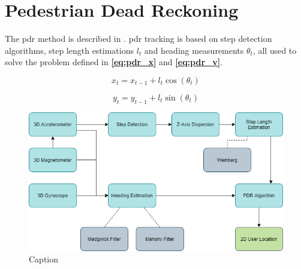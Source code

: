 \section{Pedestrian Dead Reckoning}

The \gls{pdr} method is described in \cite{HybridPositioningPaper}. \gls{pdr} tracking is based on step detection algorithms, step length estimations $l_t$ and heading measurements $\theta_t$, all used to solve the problem defined in \textbf{\autoref{eq:pdr_x}} and \textbf{\autoref{eq:pdr_y}}.

\begin{equation} \label{eq:pdr_x}
    x_t = x_{t - 1} + l_t\cos(\theta_t)
\end{equation}

\begin{equation} \label{eq:pdr_y}
    y_t = y_{t - 1} + l_t\sin(\theta_t)
\end{equation}

\begin{figure}[H] \label{fig:pdr}
    \centering
    \includegraphics[scale=0.6]{Images/Experiments/pdr.png}
    \caption{Caption}
\end{figure}





